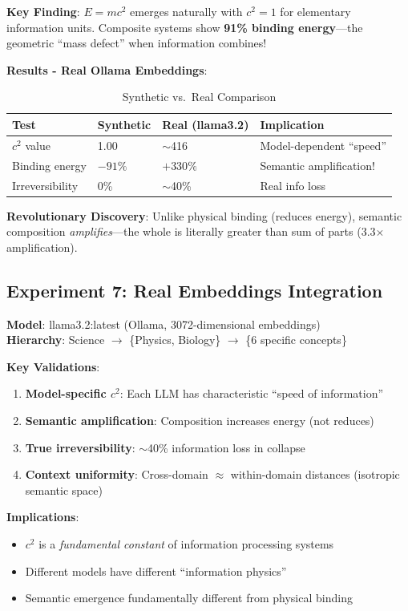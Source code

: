 \documentclass[11pt,a4paper]{article}
\begin{document}
\textbf{Key Finding}: $E=mc^2$ emerges naturally with $c^2=1$ for elementary information units. Composite systems show \textbf{91\% binding energy}---the geometric ``mass defect'' when information combines!

\textbf{Results - Real Ollama Embeddings}:

\begin{table}[h]
\centering
\begin{tabular}{llll}
\toprule
\textbf{Test} & \textbf{Synthetic} & \textbf{Real (llama3.2)} & \textbf{Implication} \\
\midrule
$c^2$ value & 1.00 & $\sim$416 & Model-dependent ``speed'' \\
Binding energy & $-91\%$ & $+330\%$ & Semantic amplification! \\
Irreversibility & 0\% & $\sim$40\% & Real info loss \\
\bottomrule
\end{tabular}
\caption{Synthetic vs.\ Real Comparison}
\end{table}

\textbf{Revolutionary Discovery}: Unlike physical binding (reduces energy), semantic composition \emph{amplifies}---the whole is literally greater than sum of parts (3.3$\times$ amplification).

\subsection{Experiment 7: Real Embeddings Integration}

\textbf{Model}: llama3.2:latest (Ollama, 3072-dimensional embeddings)\\
\textbf{Hierarchy}: Science $\to$ \{Physics, Biology\} $\to$ \{6 specific concepts\}

\textbf{Key Validations}:
\begin{enumerate}
    \item \textbf{Model-specific $c^2$}: Each LLM has characteristic ``speed of information''
    \item \textbf{Semantic amplification}: Composition increases energy (not reduces)
    \item \textbf{True irreversibility}: $\sim$40\% information loss in collapse
    \item \textbf{Context uniformity}: Cross-domain $\approx$ within-domain distances (isotropic semantic space)
\end{enumerate}

\textbf{Implications}: 
\begin{itemize}
    \item $c^2$ is a \emph{fundamental constant} of information processing systems
    \item Different models have different ``information physics''
    \item Semantic emergence fundamentally different from physical binding
\end{itemize}
\end{document}
